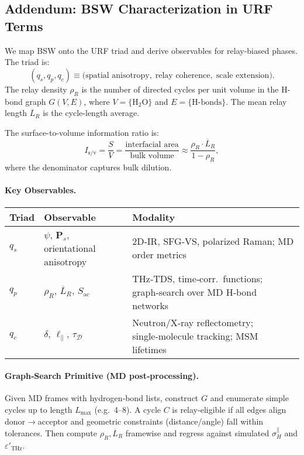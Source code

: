 \documentclass[12pt,oneside]{memoir}
\theoremstyle{plain}
\theoremstyle{definition}
\theoremstyle{remark}
\newcommand{\URF}{\textsc{URF}}
\newcommand{\Isv}{\ensuremath{I_{\mathrm{s}/\mathrm{v}}}}
\newcommand{\qS}{\ensuremath{q_s}}
\newcommand{\qP}{\ensuremath{q_p}}
\newcommand{\qC}{\ensuremath{q_c}}
\begin{document}
\subsection{Addendum: BSW Characterization in URF Terms}
We map BSW onto the \URF{} triad and derive observables for relay-biased phases. The triad is:
\[
(\qS,\qP,\qC) \equiv \big(\text{spatial anisotropy},\; \text{relay coherence},\; \text{scale extension}\big).
\]
The relay density \(\rho_R\) is the number of directed cycles per unit volume in the H-bond graph \(G(V,E)\), where \(V=\{\text{H}_2\text{O}\}\) and \(E=\{\text{H-bonds}\}\). The mean relay length \(\overline{L}_R\) is the cycle-length average. 

The surface-to-volume information ratio is:
\begin{equation}
\Isv = \frac{S}{V} = \frac{\text{interfacial area}}{\text{bulk volume}} \approx \frac{\rho_R \cdot \overline{L}_R}{1 - \rho_R},
\label{eq:URF:BSW:Isv}
\end{equation}
where the denominator captures bulk dilution.

\paragraph{Key Observables.}
\begin{center}
\begin{tabular}{@{}lll@{}}
\toprule
Triad & Observable & Modality \\
\midrule
\(q_s\) & \(\psi,\, \mathbf{P}_s\), orientational anisotropy & 2D‑IR, SFG‑VS, polarized Raman; MD order metrics \\
\(q_p\) & \(\rho_R,\, \overline{L}_R,\, S_{\mathrm{ac}}\) & THz‑TDS, time‑corr.\ functions; graph‑search over MD H‑bond networks \\
\(q_c\) & \(\delta,\, \ell_\parallel,\, \tau_{\mathcal{D}}\) & Neutron/X‑ray reflectometry; single‑molecule tracking; MSM lifetimes \\
\bottomrule
\end{tabular}
\end{center}

\paragraph{Graph‑Search Primitive (MD post‑processing).}
Given MD frames with hydrogen‑bond lists, construct \(G\) and enumerate simple cycles up to length \(L_{\max}\) (e.g.\ 4–8). A cycle \(C\) is relay‑eligible if all edges align donor\(\to\)acceptor and geometric constraints (distance/angle) fall within tolerances. Then compute \(\rho_R,\overline{L}_R\) framewise and regress against simulated \(\sigma_H^{\parallel}\) and \(\varepsilon'_{\mathrm{THz}}\).
\end{document}
